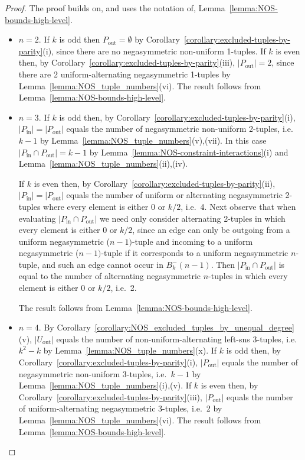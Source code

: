 \documentclass[10pt,a4paper]{amsart}
\begin{document}
\begin{proof}
The proof builds on, and uses the notation of, Lemma~\ref{lemma:NOS-bounds-high-level}.
\begin{itemize}

\item[i)] {\bf $n=2$}.  If $k$ is odd then $P_{\text{out}}=\emptyset$ by
    Corollary~\ref{corollary:excluded-tuples-by-parity}(i), since there are no negasymmetric
    non-uniform 1-tuples.  If $k$ is even then, by
    Corollary~\ref{corollary:excluded-tuples-by-parity}(iii), $|P_{\text{out}}|=2$, since there
    are 2 uniform-alternating negasymmetric 1-tuples by
    Lemma~\ref{lemma:NOS_tuple_numbers}(vi). The result follows from
    Lemma~\ref{lemma:NOS-bounds-high-level}.


\item[ii)] {\bf $n=3$}.  If $k$ is odd then, by
    Corollary~\ref{corollary:excluded-tuples-by-parity}(i), $|P_{\text{in}}|=|P_{\text{out}}|$
    equals the number of negasymmetric non-uniform 2-tuples, i.e.\ $k-1$ by
    Lemma~\ref{lemma:NOS_tuple_numbers}(v),(vii). In this case $|P_{\text{in}}\cap
    P_{\text{out}}|=k-1$ by Lemma~\ref{lemma:NOS-constraint-interactions}(i) and
    Lemma~\ref{lemma:NOS_tuple_numbers}(ii),(iv).

    If $k$ is even then, by Corollary~\ref{corollary:excluded-tuples-by-parity}(ii),
    $|P_{\text{in}}|=|P_{\text{out}}|$ equals the number of uniform or alternating
    negasymmetric 2-tuples where every element is either 0 or $k/2$, i.e.\ 4. Next observe that
    when evaluating $|P_{\text{in}}\cap P_{\text{out}}|$ we need only consider alternating
    2-tuples in which every element is either 0 or $k/2$, since an edge can only be outgoing
    from a uniform negasymmetric ($n-1)$-tuple and incoming to a uniform negasymmetric
    ($n-1)$-tuple if it corresponds to a uniform negasymmetric $n$-tuple, and such an edge
    cannot occur in $B^-_k(n-1)$.  Then $|P_{\text{in}}\cap P_{\text{out}}|$ is equal to the
    number of alternating negasymmetric $n$-tuples in which every element is either 0 or $k/2$,
    i.e.\ 2.

    The result follows from Lemma~\ref{lemma:NOS-bounds-high-level}.


\item[iii)] {\bf $n=4$}. By Corollary~\ref{corollary:NOS_excluded_tuples_by_unequal_degree}(v),
    $|U_{\text{out}}|$ equals the number of non-uniform-alternating left-sns $3$-tuples, i.e.\
    $k^2-k$ by Lemma~\ref{lemma:NOS_tuple_numbers}(x).  If $k$ is odd then, by
    Corollary~\ref{corollary:excluded-tuples-by-parity}(i), $|P_{\text{out}}|$ equals the
    number of negasymmetric non-uniform 3-tuples, i.e.\ $k-1$ by
    Lemma~\ref{lemma:NOS_tuple_numbers}(i),(v). If $k$ is even then, by
    Corollary~\ref{corollary:excluded-tuples-by-parity}(iii), $|P_{\text{out}}|$ equals the
    number of uniform-alternating negasymmetric 3-tuples, i.e.\ 2 by
    Lemma~\ref{lemma:NOS_tuple_numbers}(vi). The result follows from
    Lemma~\ref{lemma:NOS-bounds-high-level}.



\end{itemize}
\end{proof}
\end{document}
